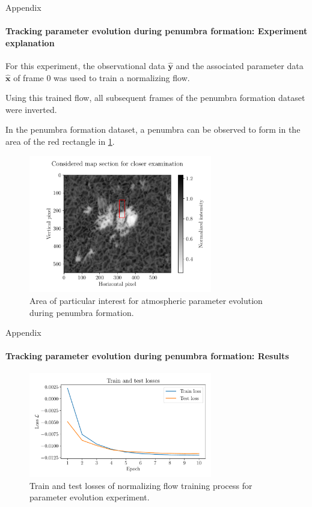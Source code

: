 \documentclass{beamer}
\newcommand\matr[1]{\ensuremath{\boldsymbol{\mathbf{#1}}}}
\begin{document}
\begin{frame}[allowframebreaks]{Appendix}
	\framesubtitle{Tracking parameter evolution during penumbra formation: Experiment explanation} %
	For this experiment, the observational data $\hat{\matr{y}}$ and the associated parameter data $\hat{\matr{x}}$ of frame 0 was used to train a normalizing flow.
	
	Using this trained flow, all subsequent frames of the penumbra formation dataset were inverted.
	
	In the penumbra formation dataset, a penumbra can be observed to form in the area of the red rectangle in \cref{fig:nf-milne-eddington-example-7-considered-map-section-nflows-piecewisequadratic}.
	
	\begin{figure}[h!]
		\centering
		\includegraphics[width=8cm]{figures/thesis/nf-milne-eddington-example-7-considered-map-section-nflows-piecewisequadratic.pdf}
		\caption{Area of particular interest for atmospheric parameter evolution during penumbra formation.}
		\label{fig:nf-milne-eddington-example-7-considered-map-section-nflows-piecewisequadratic}
	\end{figure}
\end{frame}

\begin{frame}[allowframebreaks]{Appendix}
	\framesubtitle{Tracking parameter evolution during penumbra formation: Results} %
	\begin{figure}[h!]
		\centering
		\includegraphics[width=8cm]{figures/thesis/nf-milne-eddington-example-7-loss-nflows-piecewisequadratic.pdf}
		\caption{Train and test losses of normalizing flow training process for parameter evolution experiment.}
		\label{fig:nf-milne-eddington-example-7-loss-nflows-piecewisequadratic}
	\end{figure}
\end{frame}
\end{document}

